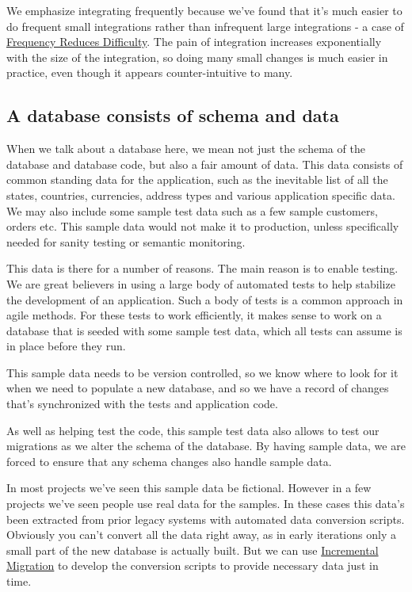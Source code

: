 \documentclass[12pt]{article}
\begin{document}
We emphasize integrating frequently because we've found that it's much
easier to do frequent small integrations rather than infrequent large
integrations - a case of
\href{https://martinfowler.com/bliki/FrequencyReducesDifficulty.html}{Frequency
Reduces Difficulty}. The pain of integration increases exponentially
with the size of the integration, so doing many small changes is much
easier in practice, even though it appears counter-intuitive to many.

\subsection{A database consists of schema and data}

When we talk about a database here, we mean not just the schema of the
database and database code, but also a fair amount of data. This data
consists of common standing data for the application, such as the
inevitable list of all the states, countries, currencies, address types
and various application specific data. We may also include some sample
test data such as a few sample customers, orders etc. This sample data
would not make it to production, unless specifically needed for sanity
testing or semantic monitoring.

This data is there for a number of reasons. The main reason is to enable
testing. We are great believers in using a large body of automated tests
to help stabilize the development of an application. Such a body of
tests is a common approach in agile methods. For these tests to work
efficiently, it makes sense to work on a database that is seeded with
some sample test data, which all tests can assume is in place before
they run.

This sample data needs to be version controlled, so we know where to
look for it when we need to populate a new database, and so we have a
record of changes that's synchronized with the tests and application
code.

As well as helping test the code, this sample test data also allows to
test our migrations as we alter the schema of the database. By having
sample data, we are forced to ensure that any schema changes also handle
sample data.

In most projects we've seen this sample data be fictional. However in a
few projects we've seen people use real data for the samples. In these
cases this data's been extracted from prior legacy systems with
automated data conversion scripts. Obviously you can't convert all the
data right away, as in early iterations only a small part of the new
database is actually built. But we can use
\href{https://martinfowler.com/bliki/IncrementalMigration.html}{Incremental
Migration} to develop the conversion scripts to provide necessary data
just in time.
\end{document}
